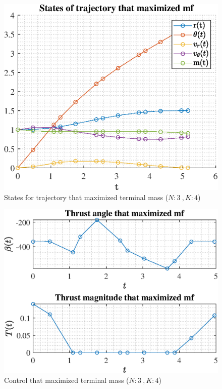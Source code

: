 \documentclass[]{article}
\begin{document}
	\begin{figure}
		\centering
		\includegraphics[scale=0.75]{states_N3_K4_C2_mf.eps}
		\caption{States for trajectory that maximized terminal mass (\(N:3\ , K:4\))}
		\label{fig:states_N3_K4_C2_mf}
	\end{figure}
	\begin{figure}
		\centering
		\includegraphics[scale=0.75]{control_N3_K4_C2_mf.eps}
		\caption{Control that maximized terminal mass (\(N:3\ , K:4\))}
		\label{fig:control_N3_K4_C2_mf}
	\end{figure}
\end{document}

